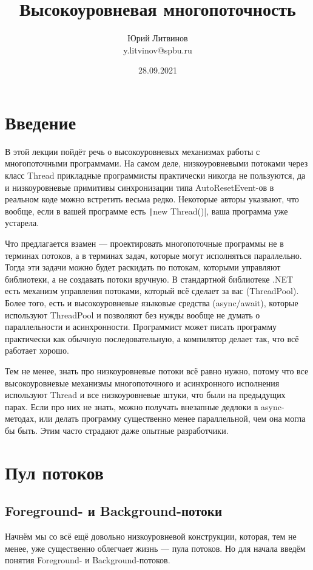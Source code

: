 \documentclass[a5paper]{article}
\title{Высокоуровневая многопоточность}
\author{Юрий Литвинов\\\small{y.litvinov@spbu.ru}}
\date{28.09.2021}
\begin{document}
\maketitle
\thispagestyle{empty}

\section{Введение}

В этой лекции пойдёт речь о высокоуровневых механизмах работы с многопоточными программами. На самом деле, низкоуровневыми потоками через класс Thread прикладные программисты практически никогда не пользуются, да и низкоуровневые примитивы синхронизации типа AutoResetEvent-ов в реальном коде можно встретить весьма редко. Некоторые авторы указвают, что вообще, если в вашей программе есть \texttt|new Thread()|, ваша программа уже устарела.

Что предлагается взамен --- проектировать многопоточные программы не в терминах потоков, а в терминах задач, которые могут исполняться параллельно. Тогда эти задачи можно будет раскидать по потокам, которыми управляют библиотеки, а не создавать потоки вручную. В стандартной библиотеке .NET есть механизм управления потоками, который всё сделает за вас (ThreadPool). Более того, есть и высокоуровневые языковые средства (async/await), которые используют ThreadPool и позволяют без нужды вообще не думать о параллельности и асинхронности. Программист может писать программу практически как обычную последовательную, а компилятор делает так, что всё работает хорошо.

Тем не менее, знать про низкоуровневые потоки всё равно нужно, потому что все высокоуровневые механизмы многопоточного и асинхронного исполнения используют Thread и все низкоуровневые штуки, что были на предыдущих парах. Если про них не знать, можно получать внезапные дедлоки в async-методах, или делать программу существенно менее параллельной, чем она могла бы быть. Этим часто страдают даже опытные разработчики.

\section{Пул потоков}

\subsection{Foreground- и Background-потоки}

Начнём мы со всё ещё довольно низкоуровневой конструкции, которая, тем не менее, уже существенно облегчает жизнь --- пула потоков. Но для начала введём понятия Foreground- и Background-потоков.
\end{document}
